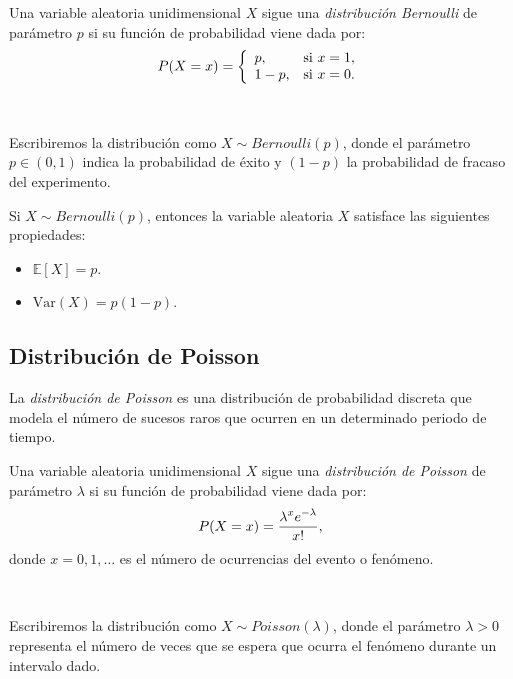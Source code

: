 \documentclass[oneside,openright,titlepage,numbers=noenddot,openany,headinclude,footinclude=true,
cleardoublepage=empty,abstractoff,BCOR=5mm,paper=a4,fontsize=12pt,main=spanish]{scrreprt}
\begin{document}
\begin{definition}
Una variable aleatoria unidimensional $X$ sigue una \textit{distribución Bernoulli} de parámetro $p$ si su función de probabilidad viene dada por: $$P(X=x)=\left \{
\begin{array}{l l}
p, & \mbox{si } x = 1, \\
1-p, & \mbox{si } x =0.
\end{array}
\right.$$
\end{definition}\

Escribiremos la distribución como $X \sim Bernoulli(p)$, donde el parámetro $p\in (0,1)$ indica la probabilidad de éxito y $(1-p)$ la probabilidad de fracaso del experimento.\\

\begin{proposition}[Propiedades]
Si $X \sim Bernoulli(p)$, entonces la variable aleatoria $X$ satisface las siguientes propiedades:
\begin{itemize}
    \item $\mathbb{E}[X]=p$.
    \item $\text{Var}(X)=p(1-p)$.
\end{itemize}
\end{proposition}

\clearpage

\subsection{Distribución de Poisson}

La \textit{distribución de Poisson} es una distribución de probabilidad discreta que modela el número de sucesos raros que ocurren en un determinado periodo de tiempo.\\

\begin{definition}
Una variable aleatoria unidimensional $X$ sigue una \textit{distribución de Poisson} de parámetro $\lambda$ si su función de probabilidad viene dada por: $$P(X=x)=\frac{\displaystyle \lambda^xe^{-\lambda}}{\displaystyle x!},$$
donde $x=0,1,\dots$ es el número de ocurrencias del evento o fenómeno.
\end{definition}\

Escribiremos la distribución como $X \sim Poisson(\lambda)$, donde el parámetro $\lambda > 0$ representa el número de veces que se espera que ocurra el fenómeno durante un intervalo dado.\\
\end{document}
